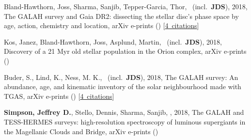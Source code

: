 
\item[{\color{numcolor}\scriptsize3}] Bland-Hawthorn, Joss, Sharma, Sanjib, Tepper-Garcia, Thor, \etal\ (incl.\ \textbf{JDS}), 2018, The GALAH survey and Gaia DR2: dissecting the stellar disc's phase space by age, action, chemistry and location, arXiv e-prints () [\href{https://ui.adsabs.harvard.edu/#abs/2018arXiv180902658B}{4~citations}]
\item[{\color{numcolor}\scriptsize3}] Kos, Janez, Bland-Hawthorn, Joss, Asplund, Martin, \etal\ (incl.\ \textbf{JDS}), 2018, Discovery of a 21 Myr old stellar population in the Orion complex, arXiv e-prints ()

\item[{\color{numcolor}\scriptsize2}] Buder, S., Lind, K., Ness, M. K., \etal\ (incl.\ \textbf{JDS}), 2018, The GALAH survey: An abundance, age, and kinematic inventory of the solar neighbourhood made with TGAS, arXiv e-prints () [\href{https://ui.adsabs.harvard.edu/#abs/2018arXiv180405869B}{4~citations}]

\item[{\color{numcolor}\scriptsize1}] \textbf{Simpson, Jeffrey D.}, Stello, Dennis, Sharma, Sanjib, \etal, 2018, The GALAH and TESS-HERMES surveys: high-resolution spectroscopy of luminous supergiants in the Magellanic Clouds and Bridge, arXiv e-prints ()